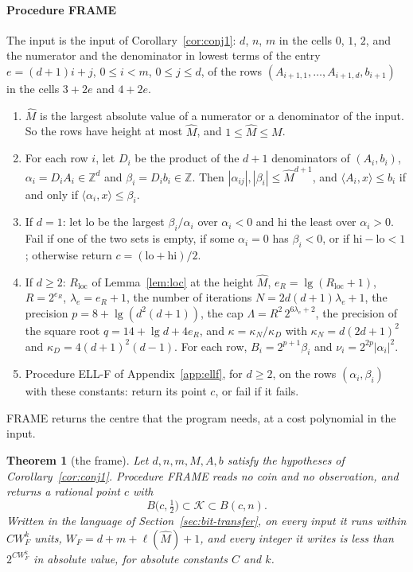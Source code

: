 \documentclass[11pt]{amsart}
\newtheorem{theorem}{Theorem}[section]
\theoremstyle{definition}
\numberwithin{equation}{section}
\newcommand{\cK}{\mathcal{K}}
\newcommand{\ip}[1]{\langle #1\rangle}
\begin{document}
\paragraph{Procedure FRAME} The input is the input of Corollary~\ref{cor:conj1}: $d$, $n$, $m$ in the cells $0$, $1$, $2$, and the numerator and the denominator in lowest terms of the entry $e=(d+1)i+j$, $0\le i<m$, $0\le j\le d$, of the rows $(A_{i+1,1},\dots,A_{i+1,d},b_{i+1})$ in the cells $3+2e$ and $4+2e$.
\begin{enumerate}[label=F\arabic*.,leftmargin=2.5em,start=0]
\item $\hat M$ is the largest absolute value of a numerator or a denominator of the input. So the rows have height at most $\hat M$, and $1\le\hat M\le M$.
\item For each row $i$, let $D_i$ be the product of the $d+1$ denominators of $(A_i,b_i)$, $\alpha_i=D_iA_i\in\mathbb Z^d$ and $\beta_i=D_ib_i\in\mathbb Z$. Then $|\alpha_{ij}|,|\beta_i|\le\hat M^{d+1}$, and $\ip{A_i,x}\le b_i$ if and only if $\ip{\alpha_i,x}\le\beta_i$.
\item If $d=1$: let $\mathrm{lo}$ be the largest $\beta_i/\alpha_i$ over $\alpha_i<0$ and $\mathrm{hi}$ the least over $\alpha_i>0$. Fail if one of the two sets is empty, if some $\alpha_i=0$ has $\beta_i<0$, or if $\mathrm{hi}-\mathrm{lo}<1$; otherwise return $c=(\mathrm{lo}+\mathrm{hi})/2$.
\item If $d\ge2$: $R_{\mathrm{loc}}$ of Lemma~\ref{lem:loc} at the height $\hat M$, $e_R=\lg(R_{\mathrm{loc}}+1)$, $R=2^{e_R}$, $\lambda_e=e_R+1$, the number of iterations $N=2d(d+1)\lambda_e+1$, the precision $p=8+\lg(d^2(d+1))$, the cap $\Lambda=R^2\,2^{6\lambda_e+2}$, the precision of the square root $q=14+\lg d+4e_R$, and $\kappa=\kappa_N/\kappa_D$ with $\kappa_N=d(2d+1)^2$ and $\kappa_D=4(d+1)^2(d-1)$. For each row, $B_i=2^{p+1}\beta_i$ and $\nu_i=2^{2p}|\alpha_i|^2$.
\item Procedure ELL-F of Appendix~\ref{app:ellf}, for $d\ge2$, on the rows $(\alpha_i,\beta_i)$ with these constants: return its point $c$, or fail if it fails.
\end{enumerate}

FRAME returns the centre that the program needs, at a cost polynomial in the input.

\begin{theorem}[the frame]\label{thm:frame}
Let $d,n,m,M,A,b$ satisfy the hypotheses of Corollary~\ref{cor:conj1}. Procedure FRAME reads no coin and no observation, and returns a rational point $c$ with
\[
B\bigl(c,\tfrac12\bigr)\subset\cK\subset B(c,n).
\]
Written in the language of Section~\ref{sec:bit-transfer}, on every input it runs within $CW_F^k$ units, $W_F=d+m+\ell(\hat M)+1$, and every integer it writes is less than $2^{CW_F^k}$ in absolute value, for absolute constants $C$ and $k$.
\end{theorem}
\end{document}
